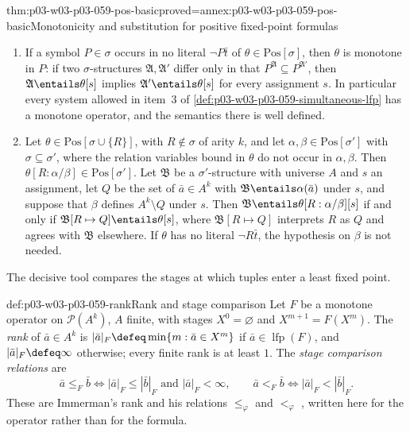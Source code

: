 \begin{hblemma}{thm:p03-w03-p03-059-pos-basic}{proved=annex:p03-w03-p03-059-pos-basic}{Monotonicity and substitution for positive fixed-point formulas}
\begin{enumerate}
 \item If a symbol \(P\in\sigma\) occurs in no literal \(\neg P\bar t\) of
       \(\theta\in\mathrm{Pos}[\sigma]\), then \(\theta\) is monotone in
       \(P\): if two \(\sigma\)-structures \(\mathfrak A,\mathfrak A'\)
       differ only in that \(P^{\mathfrak A}\subseteq P^{\mathfrak A'}\),
       then \(\mathfrak A\entails\theta[s]\) implies
       \(\mathfrak A'\entails\theta[s]\) for every assignment \(s\). In
       particular every system allowed in item~3 of
       \cref{def:p03-w03-p03-059-simultaneous-lfp} has a monotone operator,
       and the semantics there is well defined.
 \item Let \(\theta\in\mathrm{Pos}[\sigma\cup\{R\}]\), with \(R\notin\sigma\)
       of arity \(k\), and let \(\alpha,\beta\in\mathrm{Pos}[\sigma']\) with
       \(\sigma\subseteq\sigma'\), where the relation variables bound in
       \(\theta\) do not occur in \(\alpha,\beta\). Then
       \(\theta[R:\alpha/\beta]\in\mathrm{Pos}[\sigma']\). Let
       \(\mathfrak B\) be a \(\sigma'\)-structure with universe \(A\) and
       \(s\) an assignment, let \(Q\) be the set of \(\bar a\in A^k\) with
       \(\mathfrak B\entails\alpha(\bar a)\) under \(s\), and suppose that
       \(\beta\) defines \(A^k\setminus Q\) under \(s\). Then
       \(\mathfrak B\entails\theta[R:\alpha/\beta][s]\) if and only if
       \(\mathfrak B[R\mapsto Q]\entails\theta[s]\), where
       \(\mathfrak B[R\mapsto Q]\) interprets \(R\) as \(Q\) and agrees
       with \(\mathfrak B\) elsewhere. If \(\theta\) has no literal
       \(\neg R\bar t\), the hypothesis on \(\beta\) is not needed.
\end{enumerate}
\end{hblemma}

The decisive tool compares the stages at which tuples enter a least fixed
point.

\begin{hbdefinition}{def:p03-w03-p03-059-rank}{Rank and stage comparison}
Let \(F\) be a monotone operator on \(\mathcal P(A^k)\), \(A\) finite, with
stages \(X^0=\varnothing\) and \(X^{m+1}=F(X^m)\). The \emph{rank} of
\(\bar a\in A^k\) is \(|\bar a|_F\defeq\min\{m:\bar a\in X^m\}\) if
\(\bar a\in\operatorname{lfp}(F)\), and \(|\bar a|_F\defeq\infty\)
otherwise; every finite rank is at least \(1\). The \emph{stage comparison
relations} are
\[
 \bar a\le_F\bar b\iff|\bar a|_F\leq|\bar b|_F\text{ and }|\bar a|_F<\infty,
 \qquad
 \bar a<_F\bar b\iff|\bar a|_F<|\bar b|_F .
\]
These are Immerman's rank and his relations \(\leq_\varphi\) and
\(<_\varphi\) \cite[p.~97]{Immerman1986}, written here for the operator
rather than for the formula.
\end{hbdefinition}

